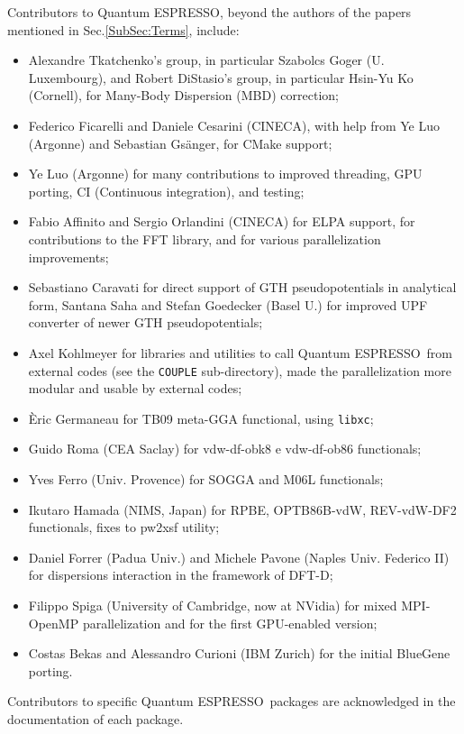 \documentclass[12pt,a4paper]{article}
\def\qe{{\sc Quantum ESPRESSO}}
\def\libxc{\texttt{libxc}}
\begin{document}
Contributors to \qe, beyond the authors of the papers
mentioned in Sec.\ref{SubSec:Terms}, include:
\begin{itemize}
  \item Alexandre Tkatchenko's group, in particular Szabolcs Goger
  (U. Luxembourg), and Robert DiStasio's group, in particular
  Hsin-Yu Ko (Cornell), for Many-Body Dispersion (MBD) correction;
  \item Federico Ficarelli and Daniele Cesarini (CINECA), with help
  from Ye Luo (Argonne) and Sebastian Gs\"anger, for CMake support;
  \item Ye Luo (Argonne) for many contributions to improved threading,
  GPU porting, CI (Continuous integration), and testing;
  \item Fabio Affinito and Sergio Orlandini (CINECA) for ELPA support, 
  for contributions to the FFT library, and for various parallelization
  improvements;
  \item Sebastiano Caravati for direct support of GTH pseudopotentials
  in analytical form, Santana Saha and Stefan Goedecker (Basel U.)
  for improved UPF converter of newer GTH pseudopotentials;
  \item Axel Kohlmeyer for libraries and utilities to call \qe\
  from external codes (see the \texttt{COUPLE} sub-directory), made the
  parallelization more modular and usable by external codes;
  \item \`Eric Germaneau for TB09 meta-GGA functional, using \libxc;
  \item Guido Roma (CEA Saclay) for  vdw-df-obk8  e vdw-df-ob86 functionals;
  \item Yves Ferro (Univ. Provence) for SOGGA and M06L functionals;
  \item Ikutaro Hamada (NIMS, Japan) for RPBE, OPTB86B-vdW, REV-vdW-DF2
	  functionals, fixes to pw2xsf utility;
  \item Daniel Forrer (Padua Univ.) and Michele Pavone
        (Naples Univ. Federico II) for dispersions interaction in the
        framework of DFT-D;
\item Filippo Spiga (University of Cambridge, now at NVidia)
  for mixed MPI-OpenMP parallelization and for the first
  GPU-enabled version;
  \item Costas Bekas and Alessandro Curioni (IBM Zurich) for the initial
  BlueGene porting.
\end{itemize}

Contributors to specific \qe\ packages are acknowledged in the
documentation of each package.
\end{document}
